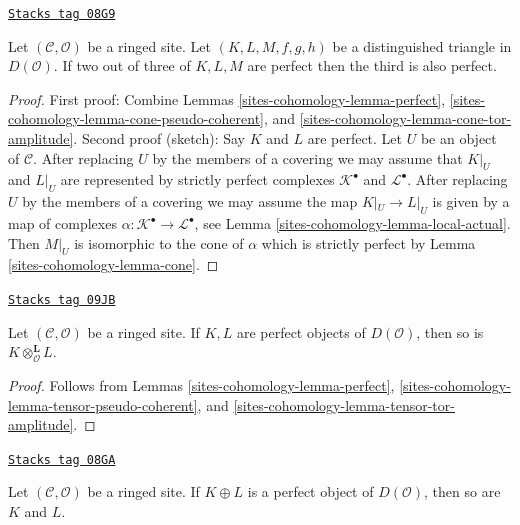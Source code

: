 \begin{lemma}
\label{sites-cohomology-lemma-two-out-of-three-perfect}
\href{https://stacks.math.columbia.edu/tag/08G9}{\texttt{Stacks tag 08G9}}

Let $(\mathcal{C}, \mathcal{O})$ be a ringed site. Let $(K, L, M, f, g, h)$
be a distinguished triangle in $D(\mathcal{O})$. If two out of three of
$K, L, M$ are perfect then the third is also perfect.
\end{lemma}

\begin{proof}
First proof: Combine
Lemmas \ref{sites-cohomology-lemma-perfect}, \ref{sites-cohomology-lemma-cone-pseudo-coherent}, and
\ref{sites-cohomology-lemma-cone-tor-amplitude}.
Second proof (sketch): Say $K$ and $L$ are perfect. Let $U$ be an object
of $\mathcal{C}$. After replacing
$U$ by the members of a covering we may assume that $K|_U$ and $L|_U$
are represented by strictly perfect complexes $\mathcal{K}^\bullet$
and $\mathcal{L}^\bullet$. After replacing $U$ by the members
of a covering we may assume the map $K|_U \to L|_U$ is given by
a map of complexes $\alpha : \mathcal{K}^\bullet \to \mathcal{L}^\bullet$,
see Lemma \ref{sites-cohomology-lemma-local-actual}.
Then $M|_U$ is isomorphic to the cone of $\alpha$ which is strictly
perfect by Lemma \ref{sites-cohomology-lemma-cone}.
\end{proof}

\begin{lemma}
\label{sites-cohomology-lemma-tensor-perfect}
\href{https://stacks.math.columbia.edu/tag/09JB}{\texttt{Stacks tag 09JB}}

Let $(\mathcal{C}, \mathcal{O})$ be a ringed site.
If $K, L$ are perfect objects of $D(\mathcal{O})$, then
so is $K \otimes_\mathcal{O}^\mathbf{L} L$.
\end{lemma}

\begin{proof}
Follows from
Lemmas \ref{sites-cohomology-lemma-perfect}, \ref{sites-cohomology-lemma-tensor-pseudo-coherent}, and
\ref{sites-cohomology-lemma-tensor-tor-amplitude}.
\end{proof}

\begin{lemma}
\label{sites-cohomology-lemma-summands-perfect}
\href{https://stacks.math.columbia.edu/tag/08GA}{\texttt{Stacks tag 08GA}}

Let $(\mathcal{C}, \mathcal{O})$ be a ringed site.
If $K \oplus L$ is a perfect object of $D(\mathcal{O})$, then
so are $K$ and $L$.
\end{lemma}

